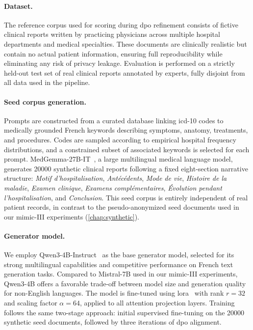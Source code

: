 \paragraph{Dataset.}
The reference corpus used for scoring during \gls{dpo} refinement consists of fictive clinical reports written by practicing physicians across multiple hospital departments and medical specialties.
These documents are clinically realistic but contain no actual patient information, ensuring full reproducibility while eliminating any risk of privacy leakage.
Evaluation is performed on a strictly held-out test set of real clinical reports annotated by experts, fully disjoint from all data used in the pipeline.

\paragraph{Seed corpus generation.}
Prompts are constructed from a curated database linking \gls{icd}-10 codes to medically grounded French keywords describing symptoms, anatomy, treatments, and procedures.
Codes are sampled according to empirical hospital frequency distributions, and a constrained subset of associated keywords is selected for each prompt.
MedGemma-27B-IT~\citep{sellergren2025medgemma}, a large multilingual medical language model, generates \num{20000} synthetic clinical reports following a fixed eight-section narrative structure: \emph{Motif d'hospitalisation}, \emph{Antécédents}, \emph{Mode de vie}, \emph{Histoire de la maladie}, \emph{Examen clinique}, \emph{Examens complémentaires}, \emph{Évolution pendant l'hospitalisation}, and \emph{Conclusion}.
This seed corpus is entirely independent of real patient records, in contrast to the pseudo-anonymized seed documents used in our \gls{mimic}-III experiments (\autoref{chap:synthetic}).

\paragraph{Generator model.}
We employ Qwen3-4B-Instruct~\citep{yang2025qwen3} as the base generator model, selected for its strong multilingual capabilities and competitive performance on French text generation tasks.
Compared to Mistral-7B used in our \gls{mimic}-III experiments, Qwen3-4B offers a favorable trade-off between model size and generation quality for non-English languages.
The model is fine-tuned using \gls{lora}~\citep{hu2022lora} with rank $r=32$ and scaling factor $\alpha=64$, applied to all attention projection layers.
Training follows the same two-stage approach: initial supervised fine-tuning on the \num{20000} synthetic seed documents, followed by three iterations of \gls{dpo} alignment.

